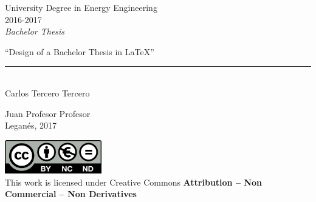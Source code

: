 \documentclass[12pt]{report} %
\begin{document}
	
	\begin{titlepage}
		\begin{sffamily}
			\color{azulUC3M}
			\begin{center}
				\begin{figure}[H] %
				\end{figure}
				\vspace{2.5cm}
				\begin{Large}
					University Degree in Energy Engineering\\			
					2016-2017\\
					\vspace{2cm}		
					\textsl{Bachelor Thesis}
					\bigskip
					
				\end{Large}
				{\Huge ``Design of a Bachelor Thesis in \LaTeX''}\\
				\vspace*{0.5cm}
				\rule{10.5cm}{0.1mm}\\
				\vspace*{0.9cm}
				{\LARGE Carlos Tercero Tercero}\\ 
				\vspace*{1cm}
				\begin{Large}
					Juan Profesor Profesor\\
					Leganés, 2017\\
				\end{Large}
			\end{center}
			\vfill
			\color{black}
			\includegraphics[width=4.2cm]{imagenes/creativecommons.png}\\
			This work is licensed under Creative Commons \textbf{Attribution – Non Commercial – Non Derivatives}
		\end{sffamily}
	\end{titlepage}
\end{document}
